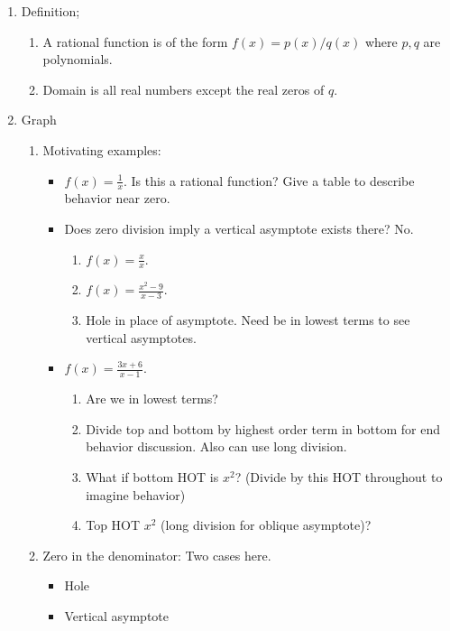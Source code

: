 \documentclass{article}
\begin{document}
\begin{enumerate}
\item Definition;
\begin{enumerate}
\item A rational function is of the form $f(x) = p(x)/q(x)$ where $p,q$ are polynomials. 
\item Domain is all real numbers except the real zeros of $q$. 
\end{enumerate}

\item Graph
\begin{enumerate}
\item Motivating examples:
\begin{itemize}

\item $f(x)=\frac{1}{x}$. Is this a rational function? Give a table to describe behavior near zero.
\item Does zero division imply a vertical asymptote exists there? No. 
\begin{enumerate}
\item $f(x) = \frac{x}{x}$.
\item $f(x) = \frac{x^2-9}{x-3}$. 
\item Hole in place of asymptote. Need be in lowest terms to see vertical asymptotes.  
\end{enumerate}

\item $f(x) = \frac{3x+6}{x-1}$. 
\begin{enumerate}
\item Are we in lowest terms?
\item Divide top and bottom by highest order term in bottom for end behavior discussion. Also can use long division. 
\item What if bottom HOT is $x^2$? (Divide by this HOT throughout to imagine behavior) 
\item Top HOT $x^2$ (long division for oblique asymptote)?
\end{enumerate}
\end{itemize}

\item Zero in the denominator: Two cases here.
\begin{itemize}
\item Hole
\item Vertical asymptote
\end{itemize}


\end{enumerate}
\end{enumerate}
\end{document}
